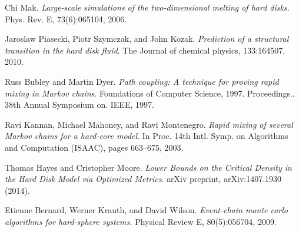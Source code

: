 \documentclass[a4paper,11pt]{article}
\begin{document}
\begin{thebibliography}{9}

  Chi Mak. 
  \emph{Large-scale simulations of the two-dimensional melting of hard disks}.
  Phys. Rev. E,
  73(6):065104, 2006.

  Jaroslaw Piasecki, Piotr Szymczak, and John Kozak.
  \emph{Prediction of a structural transition in the hard disk fluid}.
  The Journal of chemical physics,
  133:164507, 2010.

  Russ Bubley and Martin Dyer.
  \emph{Path coupling: A technique for proving rapid mixing in Markov chains}.
  Foundations of Computer Science, 1997. Proceedings., 38th Annual Symposium on. IEEE,
  1997.

  Ravi Kannan, Michael Mahoney, and Ravi Montenegro.
  \emph{Rapid mixing of several Markov chains for a hard-core model}.
  In Proc. 14th Intl. Symp. on Algorithms and Computation (ISAAC),
  pages 663–675, 2003.

  Thomas Hayes and Cristopher Moore.
  \emph{Lower Bounds on the Critical Density in the Hard Disk Model via Optimized Metrics}.
  arXiv preprint,
  arXiv:1407.1930 (2014).

  Etienne Bernard, Werner Krauth, and David Wilson.
  \emph{Event-chain monte carlo algorithms for hard-sphere systems.}
  Physical Review E,
  80(5):056704, 2009.

\end{thebibliography}
\end{document}

